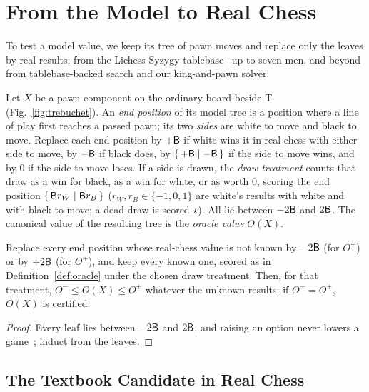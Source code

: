 \section{From the Model to Real Chess}\label{sec:real}

To test a model value, we keep its tree of pawn moves and replace only the leaves by real results: from the
Lichess Syzygy tablebase~\cite{LichessTB} up to seven men, and beyond from tablebase-backed search and our
king-and-pawn solver.

\begin{definition}\label{def:oracle}
Let $X$ be a pawn component on the ordinary board beside T (Fig.~\ref{fig:trebuchet}). An \emph{end position}
of its model tree is a position where a line of play first reaches a passed pawn; its two \emph{sides} are
white to move and black to move. Replace each end position by $+\mathsf{B}$ if white wins it in real chess with either
side to move, by $-\mathsf{B}$ if black does, by $\{\,+\mathsf{B} \mid -\mathsf{B}\,\}$ if the side to move wins, and by $0$ if the
side to move loses. If a side is drawn, the \emph{draw treatment} counts that draw as a win for black, as a win
for white, or as worth $0$, scoring the end position $\{\,\mathsf{B} r_W \mid \mathsf{B} r_B\,\}$ ($r_W,r_B\in\{-1,0,1\}$ are
white's results with white and with black to move; a dead draw is scored $\star$). All lie between $-2\mathsf{B}$ and $2\mathsf{B}$. The canonical value of the resulting tree is the \emph{oracle value} $O(X)$.
\end{definition}

\begin{lemma}\label{lem:sandwich}
Replace every end position whose real-chess value is not known by $-2\mathsf{B}$ (for $O^-$) or by $+2\mathsf{B}$ (for
$O^+$), and keep every known one, scored as in Definition~\ref{def:oracle} under the chosen draw treatment. Then, for that treatment, $O^-\le O(X)\le O^+$ whatever the unknown results; if $O^-=O^+$,
$O(X)$ is certified.
\end{lemma}
\begin{proof}
Every leaf lies between $-2\mathsf{B}$ and $2\mathsf{B}$, and raising an option never lowers a
game~\cite{Siegel2013}; induct from the leaves.
\end{proof}

\subsection{The Textbook Candidate in Real Chess}\label{sec:real-cand}

